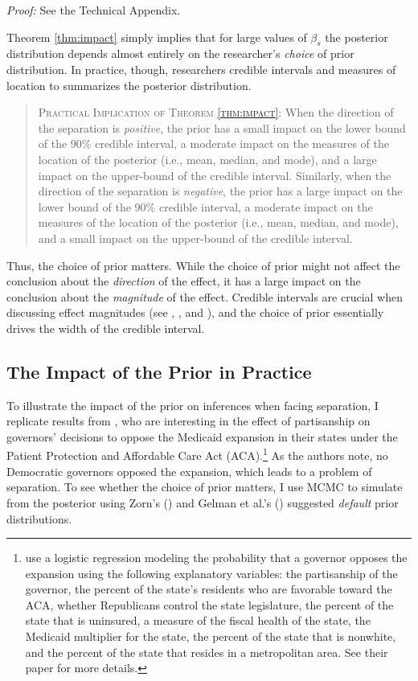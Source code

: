 \documentclass[12pt]{article}
\begin{document}
\noindent \textit{Proof:} See the Technical Appendix.

Theorem \ref{thm:impact} simply implies that for large values of $\beta_s$ the posterior distribution depends almost entirely on the researcher's \emph{choice} of prior distribution. In practice, though, researchers credible intervals and measures of location to summarizes the posterior distribution.

\begin{quote}
\textsc{Practical Implication of Theorem \ref{thm:impact}:} When the direction of the separation is \emph{positive}, the prior has a small impact on the lower bound of the 90\% credible interval, a moderate impact on the measures of the location of the posterior (i.e., mean, median, and mode), and a large impact on the upper-bound of the credible interval. Similarly, when the direction of the separation is \emph{negative}, the prior has a large impact on the lower bound of the 90\% credible interval, a moderate impact on the measures of the location of the posterior (i.e., mean, median, and mode), and a small impact on the upper-bound of the credible interval.
\end{quote}

Thus, the choice of prior matters. While the choice of prior might not affect the conclusion about the \emph{direction} of the effect, it has a large impact on the conclusion about the \emph{magnitude} of the effect. Credible intervals are crucial when discussing effect magnitudes (see \citealt{Rainey2014}, \citealt{Gross2014}, and \citealt{McCaskeyRainey2014}), and the choice of prior essentially drives the width of the credible interval.

\subsection*{The Impact of the Prior in Practice}

To illustrate the impact of the prior on inferences when facing separation, I replicate results from \cite{BarrilleauxRainey2014}, who are interesting in the effect of partisanship on governors' decisions to oppose the Medicaid expansion in their states under the Patient Protection and Affordable Care Act (ACA).\footnote{\cite{BarrilleauxRainey2014} use a logistic regression modeling the probability that a governor opposes the expansion using the following explanatory variables: the partisanship of the governor, the percent of the state's residents who are favorable toward the ACA, whether Republicans control the state legislature, the percent of the state that is uninsured, a measure of the fiscal health of the state, the Medicaid multiplier for the state, the percent of the state that is nonwhite, and the percent of the state that resides in a metropolitan area. See their paper for more details.} As the authors note, no Democratic governors opposed the expansion, which leads to a problem of separation. To see whether the choice of prior matters, I use MCMC to simulate from the posterior using Zorn's (\citeyear{Zorn2005}) and Gelman et al.'s (\citeyear{Gelmanetal2008}) suggested \emph{default} prior distributions. 
\end{document}
